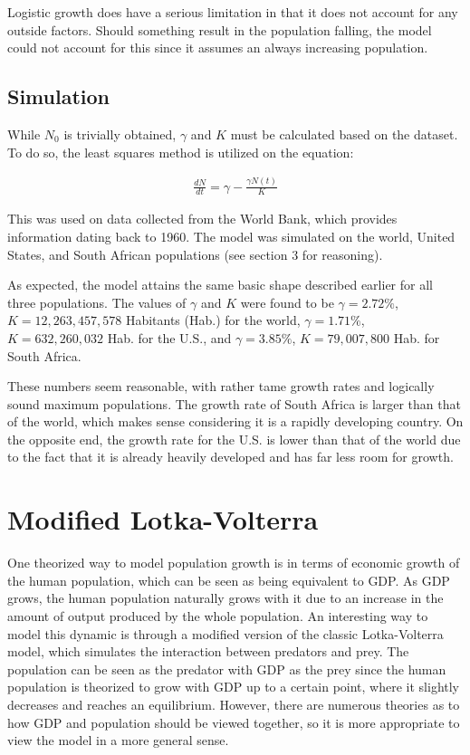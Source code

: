 \documentclass[a4paper]{article}
\begin{document}
Logistic growth does have a serious limitation in that it does not account for any outside factors. Should something result in the population falling, the model could not account for this since it assumes an always increasing population. 

\subsection{Simulation}
 
While $N_0$ is trivially obtained, $\gamma$ and $K$ must be calculated based on the dataset. To do so, the least squares method is utilized on the equation:

\begin{align}
	\frac{dN}{dt} = \gamma - \frac{\gamma N(t)}{K}
\end{align}

This was used on data collected from the World Bank, which provides information dating back to 1960. The model was simulated on the world, United States, and South African populations (see section 3 for reasoning).

As expected, the model attains the same basic shape described earlier for all three populations. The values of $\gamma$ and $K$ were found to be
 $\gamma = 2.72\%$, $K = 12,263,457,578 $ Habitants (Hab.) for the world, 
 $\gamma = 1.71\%$, $K = 632,260,032$ Hab. for the U.S., and 
 $\gamma = 3.85\%$, $K = 79,007,800$ Hab. for South Africa.
 
These numbers seem reasonable, with rather tame growth rates and logically sound maximum populations. The growth rate of South Africa is larger than that of the world, which makes sense considering it is a rapidly developing country. On the opposite end, the growth rate for the U.S. is lower than that of the world due to the fact that it is already heavily developed and has far less room for growth.

\section{Modified Lotka-Volterra}

One theorized way to model population growth is in terms of economic growth of the human population, which can be seen as being equivalent to GDP. As GDP grows, the human population naturally grows with it due to an increase in the amount of output produced by the whole population. An interesting way to model this dynamic is through a modified version of the classic Lotka-Volterra model, which simulates the interaction between predators and prey. The population can be seen as the predator with GDP as the prey since the human population is theorized to grow with GDP up to a certain point, where it slightly decreases and reaches an equilibrium. However, there are numerous theories as to how GDP and population should be viewed together, so it is more appropriate to view the model in a more general sense. 
\end{document}
